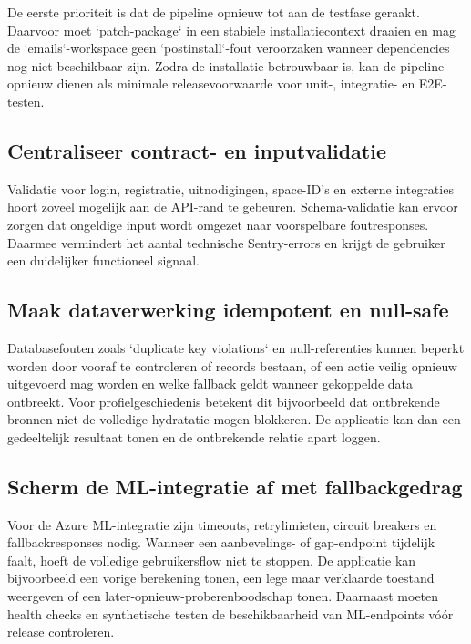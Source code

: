 De eerste prioriteit is dat de pipeline opnieuw tot aan de testfase geraakt. Daarvoor moet `patch-package` in een stabiele installatiecontext draaien en mag de `emails`-workspace geen `postinstall`-fout veroorzaken wanneer dependencies nog niet beschikbaar zijn. Zodra de installatie betrouwbaar is, kan de pipeline opnieuw dienen als minimale releasevoorwaarde voor unit-, integratie- en E2E-testen.

\subsection{Centraliseer contract- en inputvalidatie}

Validatie voor login, registratie, uitnodigingen, space-ID's en externe integraties hoort zoveel mogelijk aan de API-rand te gebeuren. Schema-validatie kan ervoor zorgen dat ongeldige input wordt omgezet naar voorspelbare foutresponses. Daarmee vermindert het aantal technische Sentry-errors en krijgt de gebruiker een duidelijker functioneel signaal.

\subsection{Maak dataverwerking idempotent en null-safe}

Databasefouten zoals `duplicate key violations` en null-referenties kunnen beperkt worden door vooraf te controleren of records bestaan, of een actie veilig opnieuw uitgevoerd mag worden en welke fallback geldt wanneer gekoppelde data ontbreekt. Voor profielgeschiedenis betekent dit bijvoorbeeld dat ontbrekende bronnen niet de volledige hydratatie mogen blokkeren. De applicatie kan dan een gedeeltelijk resultaat tonen en de ontbrekende relatie apart loggen.

\subsection{Scherm de ML-integratie af met fallbackgedrag}

Voor de Azure ML-integratie zijn timeouts, retrylimieten, circuit breakers en fallbackresponses nodig. Wanneer een aanbevelings- of gap-endpoint tijdelijk faalt, hoeft de volledige gebruikersflow niet te stoppen. De applicatie kan bijvoorbeeld een vorige berekening tonen, een lege maar verklaarde toestand weergeven of een later-opnieuw-proberenboodschap tonen. Daarnaast moeten health checks en synthetische testen de beschikbaarheid van ML-endpoints vóór release controleren.


